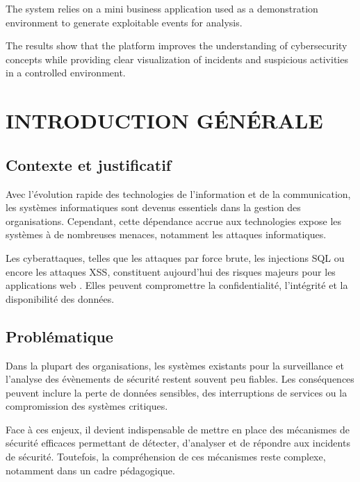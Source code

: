 \documentclass[a4paper,12pt]{report}
\begin{document}
    The system relies on a mini business application used as a demonstration environment to generate exploitable events for analysis.
    
    The results show that the platform improves the understanding of cybersecurity concepts while providing clear visualization of incidents and suspicious activities in a controlled environment.
    
    \clearpage
    \tableofcontents    
    \newpage
    
    
    \chapter{INTRODUCTION GÉNÉRALE}
    
    \section{Contexte et justificatif}
    
    Avec l’évolution rapide des technologies de l’information et de la communication, les systèmes informatiques sont devenus essentiels dans la gestion des organisations. Cependant, cette dépendance accrue aux technologies expose les systèmes à de nombreuses menaces, notamment les attaques informatiques.
    
    Les cyberattaques, telles que les attaques par force brute, les injections SQL ou encore les attaques XSS, constituent aujourd’hui des risques majeurs pour les applications web \cite{owasp}. Elles peuvent compromettre la confidentialité, l’intégrité et la disponibilité des données.
    
    \section{Problématique}
      
    Dans la plupart des organisations, les systèmes existants pour la surveillance et l'analyse des évènements de sécurité restent souvent peu fiables. Les conséquences peuvent inclure la perte de données sensibles, des interruptions de services ou la compromission des systèmes critiques. 
    
    Face à ces enjeux, il devient indispensable de mettre en place des mécanismes de sécurité efficaces permettant de détecter, d’analyser et de répondre aux incidents de sécurité. Toutefois, la compréhension de ces mécanismes reste complexe, notamment dans un cadre pédagogique. 
    
\end{document}

